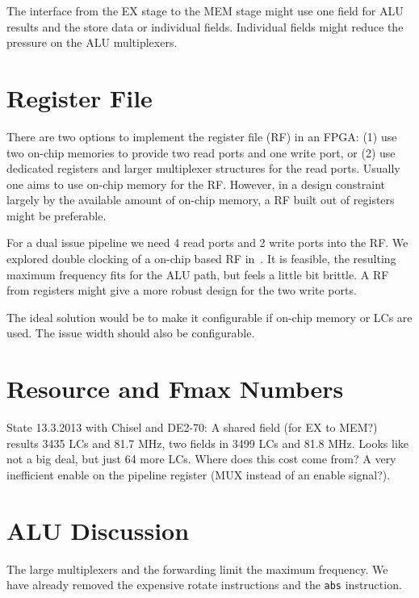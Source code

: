 \documentclass[a4paper,fontsize=10pt,twoside,DIV15,BCOR12mm,headinclude=true,footinclude=false,pagesize,bibtotoc]{scrbook}
\newcommand{\code}[1]{{\texttt{#1}}}
\newcommand{\comment}[3]{

\textsf{\textbf{#1}} {\color{#3}#2}}
\newcommand{\martin}[1]{\comment{Martin}{#1}{Blue}}
\renewcommand{\martin}[1]{}
\begin{document}
The interface from the EX stage to the MEM stage might use one
field for ALU results and the store data or individual fields. Individual
fields might reduce the pressure on the ALU multiplexers.
\martin{Update to the current implementation -- check for difference.}


\section{Register File}

There are two options to implement the register file (RF) in an FPGA: (1) use
two on-chip memories to provide two read ports and one write port, or (2)
use dedicated registers and larger multiplexer structures for the read
ports. Usually one aims to use on-chip memory for the RF. However,
in a design constraint largely by the available amount of on-chip memory,
a RF built out of registers might be preferable.

For a dual issue pipeline we need 4 read ports and 2 write ports into the RF.
We explored double clocking of a on-chip based RF in~\cite{patmos:ppes2011}.
It is feasible, the resulting maximum frequency fits for the ALU path, but feels
a little bit brittle. A RF from registers might give a more robust design for the
two write ports.

The ideal solution would be to make it configurable if on-chip memory or
LCs are used. The issue width should also be configurable.




\section{Resource and Fmax Numbers}

State 13.3.2013 with Chisel and DE2-70: A shared field (for EX to MEM?) results 3435 LCs
and 81.7 MHz, two fields in 3499 LCs and 81.8 MHz. Looks like not a big deal,
but just 64 more LCs. Where does this cost come from? A very inefficient
enable on the pipeline register (MUX instead of an enable signal?).

\martin{Update with reduced ALU muxes and also with additional second
ALU pipeline (forwarding). Is dual issue configurable?}

\section{ALU Discussion}

The large multiplexers and the forwarding limit the maximum frequency.
We have already removed the expensive rotate instructions and the
\code{abs} instruction.
\end{document}
